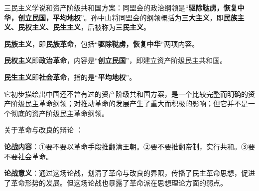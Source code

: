 {三民主义学说和资产阶级共和国方案：同盟会的政治纲领是``\textbf{{驱除鞑虏，恢复中华，创立民国，平均地权}}''。孙中山将同盟会的纲领概括为\textbf{{三大主义}}，即\textbf{{民族主义、民权主义、民生主义}}，后被称为\textbf{{三民主义}}。}

{\textbf{{民族主义}}{，即}\textbf{{民族革命}}{，包括``}\textbf{{驱除鞑虏，恢复中华}}{''两项内容。}}

{\textbf{{民权主义}}{即}\textbf{{政治革命}}{，内容是``}\textbf{{创立民国}}{''，即建立资产阶级民主共和国。}}

{\textbf{{民生主义}}{即}\textbf{{社会革命}}{，指的是``}\textbf{{平均地权}}{''。}}

{{它初步描绘出中国还不曾有过的资产阶级共和国方案，是一个比较完整而明确的资产阶级民主革命纲领；对推动革命的发展产生了重大而积极的影响；但它并不是一个彻底的资产阶级民主革命纲领}{。}}

{关于革命与改良的辩论 ：}

{\textbf{{论战内容}}{：}{①要不要以革命手段推翻清王朝。②要不要推翻帝制，实行共和。③要不要社会革命}{。}}

{\textbf{{论战意义}}{：}{通过这场论战，划清了革命与改良的界限，传播了民主革命思想，促进了革命形势的发展}{。但这场论战也暴露了革命派在思想理论方面的弱点。}}
